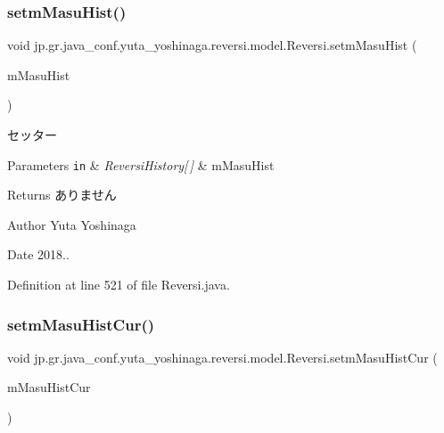\subsubsection{\texorpdfstring{setm\+Masu\+Hist()}{setmMasuHist()}}
{\footnotesize\ttfamily void jp.\+gr.\+java\+\_\+conf.\+yuta\+\_\+yoshinaga.\+reversi.\+model.\+Reversi.\+setm\+Masu\+Hist (\begin{DoxyParamCaption}\item[{\hyperlink{classjp_1_1gr_1_1java__conf_1_1yuta__yoshinaga_1_1reversi_1_1model_1_1_reversi_history}{Reversi\+History} \mbox{[}$\,$\mbox{]}}]{m\+Masu\+Hist }\end{DoxyParamCaption})}



セッター 


\begin{DoxyParams}[1]{Parameters}
\mbox{\tt in}  & {\em Reversi\+History\mbox{[}$\,$\mbox{]}} & m\+Masu\+Hist \\
\hline
\end{DoxyParams}
\begin{DoxyReturn}{Returns}
ありません 
\end{DoxyReturn}
\begin{DoxyAuthor}{Author}
Yuta Yoshinaga 
\end{DoxyAuthor}
\begin{DoxyDate}{Date}
2018.. 
\end{DoxyDate}


Definition at line 521 of file Reversi.\+java.

\mbox{\label{classjp_1_1gr_1_1java__conf_1_1yuta__yoshinaga_1_1reversi_1_1model_1_1_reversi_aec45670d2755fc324fec09fc6b6ff89f}} 
\subsubsection{\texorpdfstring{setm\+Masu\+Hist\+Cur()}{setmMasuHistCur()}}
{\footnotesize\ttfamily void jp.\+gr.\+java\+\_\+conf.\+yuta\+\_\+yoshinaga.\+reversi.\+model.\+Reversi.\+setm\+Masu\+Hist\+Cur (\begin{DoxyParamCaption}\item[{int}]{m\+Masu\+Hist\+Cur }\end{DoxyParamCaption})}




